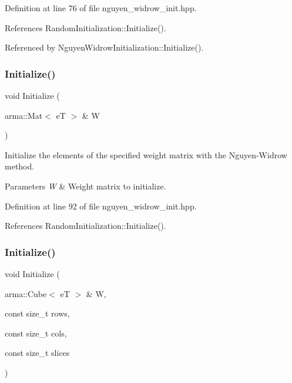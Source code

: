 Definition at line 76 of file nguyen\+\_\+widrow\+\_\+init.\+hpp.



References Random\+Initialization\+::\+Initialize().



Referenced by Nguyen\+Widrow\+Initialization\+::\+Initialize().

\mbox{\label{classmlpack_1_1ann_1_1NguyenWidrowInitialization_af2d770912321b8b9ca7b03ab98f735c0}} 
\subsubsection{Initialize()\hspace{0.1cm}{\footnotesize\ttfamily [2/4]}}
{\footnotesize\ttfamily void Initialize (\begin{DoxyParamCaption}\item[{arma\+::\+Mat$<$ eT $>$ \&}]{W }\end{DoxyParamCaption})\hspace{0.3cm}{\ttfamily [inline]}}



Initialize the elements of the specified weight matrix with the Nguyen-\/\+Widrow method. 


\begin{DoxyParams}{Parameters}
{\em W} & Weight matrix to initialize. \\
\hline
\end{DoxyParams}


Definition at line 92 of file nguyen\+\_\+widrow\+\_\+init.\+hpp.



References Random\+Initialization\+::\+Initialize().

\mbox{\label{classmlpack_1_1ann_1_1NguyenWidrowInitialization_a40a2b6466bdba0f6aab4eb92b6e65934}} 
\subsubsection{Initialize()\hspace{0.1cm}{\footnotesize\ttfamily [3/4]}}
{\footnotesize\ttfamily void Initialize (\begin{DoxyParamCaption}\item[{arma\+::\+Cube$<$ eT $>$ \&}]{W,  }\item[{const size\+\_\+t}]{rows,  }\item[{const size\+\_\+t}]{cols,  }\item[{const size\+\_\+t}]{slices }\end{DoxyParamCaption})\hspace{0.3cm}{\ttfamily [inline]}}



